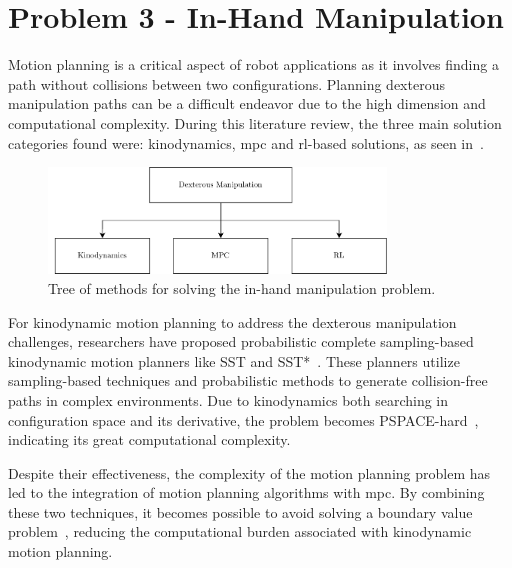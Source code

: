 \section{Problem 3 - In-Hand Manipulation}\label{sec:lit-rev-problem-3}

Motion planning is a critical aspect of robot applications as it involves finding a path without collisions between two configurations. Planning dexterous manipulation paths can be a difficult endeavor due to the high dimension and computational complexity. During this literature review, the three main solution categories found were: kinodynamics, \gls{mpc} and \gls{rl}-based solutions, as seen in~. \medskip

\begin{figure}[h]
	\begin{small}
		\begin{center}
			\includegraphics[width=0.8\textwidth]{chapters/state-of-the-art/fig/categories-dex-man.pdf}
		\end{center}
		\caption{Tree of methods for solving the in-hand manipulation problem.}
		\label{fig:dm-categories}
	\end{small}
\end{figure}

For kinodynamic motion planning to address the dexterous manipulation challenges, researchers have proposed probabilistic complete sampling-based kinodynamic motion planners like SST and SST*~\cite{asymptotically-optimal-sampling-based-kinodynamic-planning}. These planners utilize sampling-based techniques and probabilistic methods to generate collision-free paths in complex environments. Due to kinodynamics both searching in configuration space and its derivative, the problem becomes PSPACE-hard~\cite*{planning-algorithms}, indicating its great computational complexity. \medskip

Despite their effectiveness, the complexity of the motion planning problem has led to the integration of motion planning algorithms with \gls{mpc}. By combining these two techniques, it becomes possible to avoid solving a boundary value problem~\cite{mpc-mpnet-model-predictive-motion-planning-networks-for-fast-near-optimal-planning-under-kinodynamic-constraints}, reducing the computational burden associated with kinodynamic motion planning. \medskip

